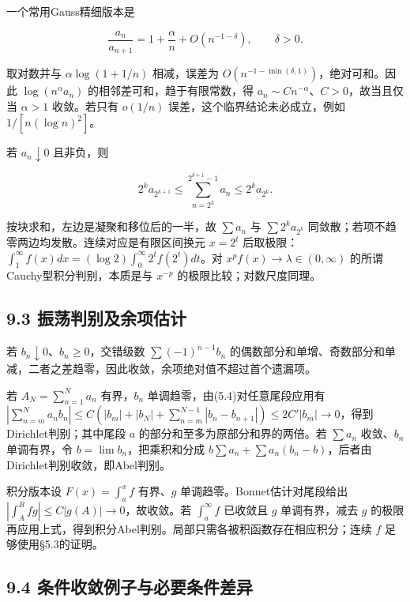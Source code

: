 \documentclass[11pt,a4paper]{article}
\begin{document}
一个常用Gauss精细版本是

\[
\frac{a_n}{a_{n+1}}=1+\frac\alpha n+O(n^{-1-\delta}),\qquad\delta>0.
\]

取对数并与 \(\alpha\log(1+1/n)\) 相减，误差为
\(O(n^{-1-\min(\delta,1)})\)，绝对可和。因此 \(\log(n^\alpha a_n)\)
的相邻差可和，趋于有限常数，得
\(a_n\sim Cn^{-\alpha}\)、\(C>0\)，故当且仅当 \(\alpha>1\) 收敛。若只有
\(o(1/n)\) 误差，这个临界结论未必成立，例如 \(1/[n(\log n)^2]\)。

若 \(a_n\downarrow0\) 且非负，则

\[
2^ka_{2^{k+1}}\le\sum_{n=2^k}^{2^{k+1}-1}a_n\le2^ka_{2^k}.
\]

按块求和，左边是凝聚和移位后的一半，故 \(\sum a_n\) 与
\(\sum2^ka_{2^k}\) 同敛散；若项不趋零两边均发散。连续对应是有限区间换元
\(x=2^t\)
后取极限：\(\int_1^\infty f(x)dx=(\log2)\int_0^\infty2^tf(2^t)dt\)。对
\(x^pf(x)\to\lambda\in(0,\infty)\) 的所谓Cauchy型积分判别，本质是与
\(x^{-p}\) 的极限比较；对数尺度同理。

\subsection{9.3
振荡判别及余项估计}\label{ux632fux8361ux5224ux522bux53caux4f59ux9879ux4f30ux8ba1}

若 \(b_n\downarrow0\)、\(b_n\ge0\)，交错级数 \(\sum(-1)^{n-1}b_n\)
的偶数部分和单增、奇数部分和单减，二者之差趋零，因此收敛，余项绝对值不超过首个遗漏项。

若 \(A_N=\sum_{n=1}^Na_n\) 有界，\(b_n\)
单调趋零，由(5.4)对任意尾段应用有
\(|\sum_{n=m}^Na_nb_n|\le C(|b_m|+|b_N|+\sum_{n=m}^{N-1}|b_n-b_{n+1}|)\le 2C'|b_m|\to0\)，得到Dirichlet判别；其中尾段
\(a\) 的部分和至多为原部分和界的两倍。若 \(\sum a_n\) 收敛、\(b_n\)
单调有界，令 \(b=\lim b_n\)，把乘积和分成
\(b\sum a_n+\sum a_n(b_n-b)\)，后者由Dirichlet判别收敛，即Abel判别。

积分版本设 \(F(x)=\int_a^xf\) 有界、\(g\) 单调趋零。Bonnet估计对尾段给出
\(|\int_A^Bfg|\le C|g(A)|\to0\)，故收敛。若 \(\int_a^\infty f\) 已收敛且
\(g\) 单调有界，减去 \(g\)
的极限再应用上式，得到积分Abel判别。局部只需各被积函数存在相应积分；连续
\(f\) 足够使用§5.3的证明。

\subsection{9.4
条件收敛例子与必要条件差异}\label{ux6761ux4ef6ux6536ux655bux4f8bux5b50ux4e0eux5fc5ux8981ux6761ux4ef6ux5deeux5f02}
\end{document}
